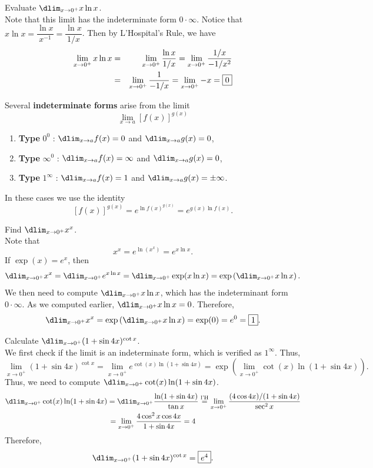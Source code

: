 \documentclass{book}
\newcommand{\lHeq}{\overset{\text{l'H}}{=}}
\begin{document}
\begin{Exam} Evaluate $\dlim_{x\to 0^+} x\ln x$.\\

Note that this limit has the indeterminate form $0\cdot \infty$. Notice that $x\ln x = \dfrac{\ln x}{x^{-1}} = \dfrac{\ln x}{1/x}$. Then by L'Hospital's Rule, we have 
\begin{eqnarray*}
\lim_{x\to 0^+} x\ln x &=& \lim_{x\to 0^+}\dfrac{\ln x}{1/x} =  \lim_{x\to 0^+} \dfrac{1/x}{-1/x^2}\\
&=&  \lim_{x\to 0^+} \dfrac{1}{-1/x} =  \lim_{x\to 0^+} -x = \fbox{$0$} 
\end{eqnarray*}
\end{Exam}\vs

Several \textbf{indeterminate forms} arise from the limit \[\lim_{x\to a} [f(x)]^{g(x)}\]
\begin{enumerate}[!THM!,start=1]
\item \textbf{Type} $0^0$ : $\dlim_{x\to a} f(x) = 0$ and $\dlim_{x\to a} g(x) = 0$, 
\item \textbf{Type} $\infty^0$ : $\dlim_{x\to a} f(x) = \infty$ and $\dlim_{x\to a}  g(x) = 0$,
\item \textbf{Type} $1^\infty$ : $\dlim_{x\to a} f(x) = 1$ and $\dlim_{x\to a}  g(x) = \pm\infty$.
\end{enumerate} In  these cases we use the identity \[[f(x)]^{g(x)} = e^{\ln f(x)^{g(x)}} = e^{g(x)\ln f(x)}.\]

\begin{Exam} Find $\dlim_{x\to 0^+} x^x$.\\

Note that 
\[x^x = e^{\ln (x^x)} = e^{x\ln x}.\] If $\exp(x) = e^x$, then  
\[\dlim_{x\to 0^+} x^x = \dlim_{x\to 0^+} e^{x\ln x} = \dlim_{x\to 0^+} \exp(x\ln x) = \exp\left(\dlim_{x\to 0^+} x\ln x\right).\] We then need to compute $\dlim_{x\to 0^+} x\ln x$, which has the indeterminant form $0\cdot \infty$. As we computed earlier, $\dlim_{x\to 0^+} x\ln x = 0$. Therefore, 
\[\dlim_{x\to 0^+} x^x = \exp\left(\dlim_{x\to 0^+} x\ln x\right) = \exp(0) = e^0 = \fbox{$1$}. \]
\end{Exam}\vs

\begin{Exam} Calculate $\dlim_{x\to 0^+} (1+\sin 4x)^{\cot x}$.\\

We first check if the limit is an indeterminate form, which is verified as $1^\infty$. Thus,
\[ \lim_{x\to 0^+} (1+\sin 4x)^{\cot x} = \lim_{x\to 0^+} e^{\cot(x)\ln(1+\sin 4x)} = \exp\left(\lim_{x\to 0^+} \cot(x)\ln(1+\sin 4x)\right).\] Thus, we need to compute $\dlim_{x\to 0^+} \cot(x)\ln(1+\sin 4x)$.
\begin{multline*}\dlim_{x\to 0^+} \cot(x)\ln(1+\sin 4x) =  \dlim_{x\to 0^+} \dfrac{\ln(1+\sin 4x)}{\tan x}
\lHeq \lim_{x\to 0^+} \dfrac{(4\cos 4x)/(1+\sin 4x)}{\sec^2 x} \\
= \lim_{x\to 0^+} \dfrac{4\cos^2 x \cos 4x}{1+\sin 4x} = 4\end{multline*}
Therefore, \[\dlim_{x\to 0^+} (1+\sin 4x)^{\cot x} = \fbox{$e^4$}. \]
\end{Exam}\vs
\end{document}
